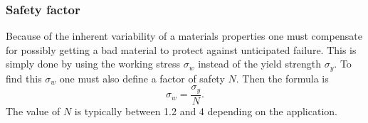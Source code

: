 \subsubsection{Safety factor}
Because of the inherent variability of a materials properties one must compensate for possibly getting a bad material to protect against unticipated failure. This is simply done by using the working stress $\sigma_w$ instead of the yield strength $\sigma_y$. To find this $\sigma_w$ one must also define a factor of safety $N$. Then the formula is
\[ 
\sigma_w = \frac{\sigma_y}{N}
.\]
The value of $N$ is typically between \num{1,2} and 4 depending on the application.
